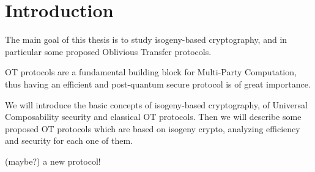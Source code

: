 \chapter*{Introduction}

The main goal of this thesis is to study isogeny-based cryptography, and in particular some proposed Oblivious Transfer protocols.

OT protocols are a fundamental building block for Multi-Party Computation, thus having an efficient and post-quantum secure protocol is of great importance.

We will introduce the basic concepts of isogeny-based cryptography, of Universal Composability security and classical OT protocols. Then we will describe some proposed OT protocols which are based on isogeny crypto, analyzing efficiency and security for each one of them.

(maybe?) a new protocol!